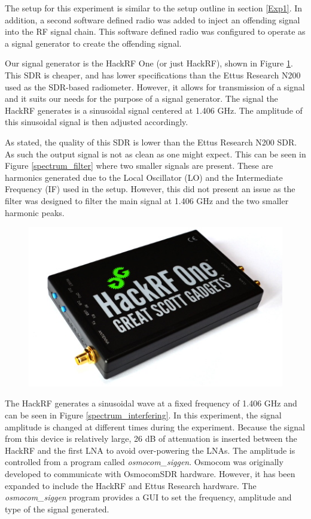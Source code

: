 The setup for this experiment is similar to the setup outline in section \ref{Exp1}.  In addition, a second software defined radio was added to inject an offending signal into the RF signal chain.  This software defined radio was configured to operate as a signal generator to create the offending signal.  

Our signal generator is the HackRF One (or just HackRF), shown in Figure \ref{HackRF}.  This SDR is cheaper, and has lower specifications than the Ettus Research N200 used as the SDR-based radiometer.  However, it allows for transmission of a signal and it suits our needs for the purpose of a signal generator.  The signal the HackRF generates is a sinusoidal signal centered at 1.406 GHz.  The amplitude of this sinusoidal signal is then adjusted accordingly. 

As stated, the quality of this SDR is lower than the Ettus Research N200 SDR.  As such the output signal is not as clean as one might expect.  This can be seen in Figure \ref{spectrum_filter} where two smaller signals are present.  These are harmonics generated due to the Local Oscillator (LO) and the Intermediate Frequency (IF) used in the setup.  However, this did not present an issue as the filter was designed to filter the main signal at 1.406 GHz and the two smaller harmonic peaks.

\begin{figure}[h!tb] \centering

\includegraphics[width=12cm]{Images/hackrf.jpg}
\label{HackRF}
\end{figure} 

The HackRF generates a sinusoidal wave at a fixed frequency of 1.406 GHz and can be seen in Figure \ref{spectrum_interfering}.  In this experiment, the signal amplitude is changed at different times during the experiment.  Because the signal from this device is relatively large, 26 dB of attenuation is inserted between the HackRF and the first LNA to avoid over-powering the LNAs.  The amplitude is controlled from a program called \emph{osmocom\_siggen}.  Osmocom was originally developed to communicate with OsmocomSDR hardware.  However, it has been expanded to include the HackRF and Ettus Research hardware.  The \emph{osmocom\_siggen} program provides a GUI to set the frequency, amplitude and type of the signal generated.  

